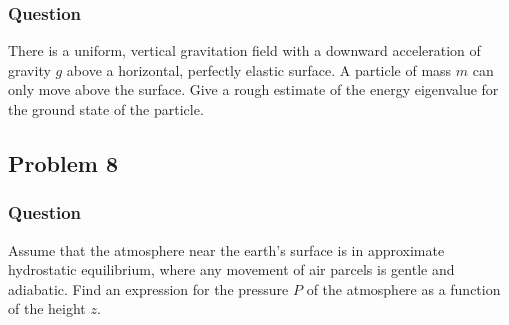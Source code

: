 \subsubsection{Question}
There is a uniform, vertical gravitation field with a downward acceleration of
gravity $g$ above a horizontal, perfectly elastic surface. A particle of mass
$m$ can only move above the surface. Give a rough estimate of the energy
eigenvalue for the ground state of the particle.



\clearpage
\subsection{Problem 8}
\subsubsection{Question}
Assume that the atmosphere near the earth's surface is in approximate
hydrostatic equilibrium, where any movement of air parcels is gentle and
adiabatic. Find an expression for the pressure $P$ of the atmosphere as a
function of the height $z$.

